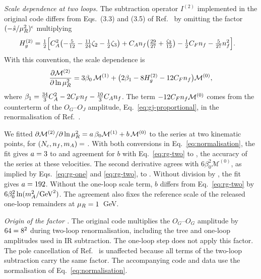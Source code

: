 \emph{Scale dependence at two loops.}
The subtraction operator $I^{(2)}$ implemented in the original code
differs from Eqs.~(3.3) and (3.5) of Ref.~\cite{Bhattacharya:2019bmd}
by omitting the factor $(-\hat s/\mu_R^2)^\epsilon$ multiplying
\begin{align}
 H_g^{(2)}
 &=\tfrac12\Bigl[
 C_A^2\bigl(-\tfrac{5}{12}-\tfrac{11}{24}\zeta_2-\tfrac12\zeta_3\bigr)
 +C_An_f\bigl(\tfrac{29}{27}+\tfrac{\zeta_2}{12}\bigr)
 -\tfrac12C_Fn_f-\tfrac{5}{27}n_f^2\Bigr].
 \label{eq:H2}
\end{align}
With this convention, the scale dependence is
\begin{equation}
 \frac{\partial\mathcal{M}^{(2)}_{}}{\partial\ln\mu_R^2}
 =3\beta_0\,\mathcal M^{(1)}
 +\bigl(2\beta_1-8H_g^{(2)}-12C_Fn_f\bigr)\mathcal M^{(0)},
 \label{eq:rg-two}
\end{equation}
where
$\beta_1=\tfrac{34}{3}C_A^2-2C_Fn_f-\tfrac{10}{3}C_An_f$.
The term $-12C_Fn_f\mathcal M^{(0)}$ comes from the counterterm
of the $O_G$--$O_J$ amplitude, Eq.~\eqref{eq:gj-proportional},
in the renormalisation of Ref.~\cite{Bhattacharya:2019bmd}.

We fitted
$\partial\mathcal{M}^{(2)}_{}/\partial\ln\mu_R^2
=a\,\beta_0\mathcal M^{(1)}+b\,\mathcal M^{(0)}$
to the series at two kinematic points, for
$(N_c,n_f,m_A)=$ \RGSets{}.
With both conversions in Eq.~\eqref{eq:normalisation}, the fit gives
$a=3$ to \RGaDev{} and agreement for $b$ with
Eq.~\eqref{eq:rg-two} to \RGbDev{}, the accuracy of the series
at these velocities.
The second derivative agrees with $6\beta_0^2\mathcal M^{(0)}$,
as implied by Eqs.~\eqref{eq:rg-one} and \eqref{eq:rg-two},
to \RGSecondDev{}.
Without division by \FileFactor{}, the fit gives
$a=192$.
Without the one-loop scale term, $b$ differs from
Eq.~\eqref{eq:rg-two} by
$6\beta_0^2\ln(m_A^2/\mathrm{GeV}^2)$.
The agreement also fixes the reference scale of the released
one-loop remainders at $\mu_R=1$~GeV.

\emph{Origin of the factor \FileFactor{}.}
The original code multiplies the $O_G$--$O_G$ amplitude by
$64=8^2$ during two-loop renormalisation,
including the tree and one-loop amplitudes used in IR  subtraction.
The one-loop step does not apply this factor.
The pole cancellation of Ref.~\cite{Bhattacharya:2019bmd} is unaffected
because all terms of the two-loop subtraction carry the same factor.
The accompanying code and data use the normalisation of
Eq.~\eqref{eq:normalisation}.

